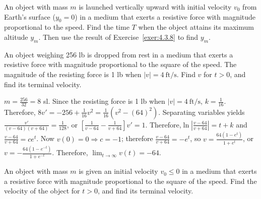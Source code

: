 \documentclass{ximera}
\begin{document}
\begin{problem}\label{exer:4.3.9}
An object with mass $m$ is launched vertically upward with initial
velocity $v_0$ from Earth's surface ($y_0=0$) in a medium that exerts
a resistive force with magnitude proportional to the speed. Find the
time $T$ when the object attains its maximum altitude $y_m$. Then use
the result of Exercise~\ref{exer:4.3.8} to find $y_m$.
\end{problem}

\begin{problem}\label{exer:4.3.10}
An object weighing 256 lb is dropped from rest in a medium that
exerts a resistive force with magnitude proportional to the square of
the speed. The magnitude of the resisting force is 1 lb when $|v|=4\
\mbox{ft/s}$. Find $v$ for $t > 0$, and find its terminal
velocity.

\begin{solution}
$m=\frac{256}{32}=8$ sl.
Since the
resisting force is 1 lb when $|v|=4\ \mbox{ft/s}$,
$k=\frac{1}{16}$.
 Therefore,
$8v'=-256+\frac{1}{16}v^2=\frac{1}{16}\left(v^2-(64)^2\right)$.
Separating variables yields
$\frac{v'}{(v-64)(v+64)}=\frac{1}{128}$, or $\left[\frac{1}{v-64}-\frac{1}{v+64}\right]v'=1$. Therefore,$\ln\left|\frac{v-64}{v+64}\right|=t+k$ and $\frac{v-64}{v+64}=ce^t$.
Now $v(0)=0\Rightarrow c=-1$; therefore $\frac{v-64}{v+64}=-e^t$, so
$v=\frac{64(1-e^t)}{1+e^t}$, or
$v=-\frac{64(1-e^{-t})}{1+e^{-t}}$.  Therefore,
$\lim_{t\to\infty}v(t)=-64$.
\end{solution}
\end{problem}

\begin{problem}\label{exer:4.3.11}
An object with mass $m$ is given an initial velocity $v_0\le0$ in
a medium that exerts
a resistive force with magnitude proportional to the square of the
speed. Find the velocity of the object for $t > 0$, and find its
terminal velocity.
\end{problem}
\end{document}
